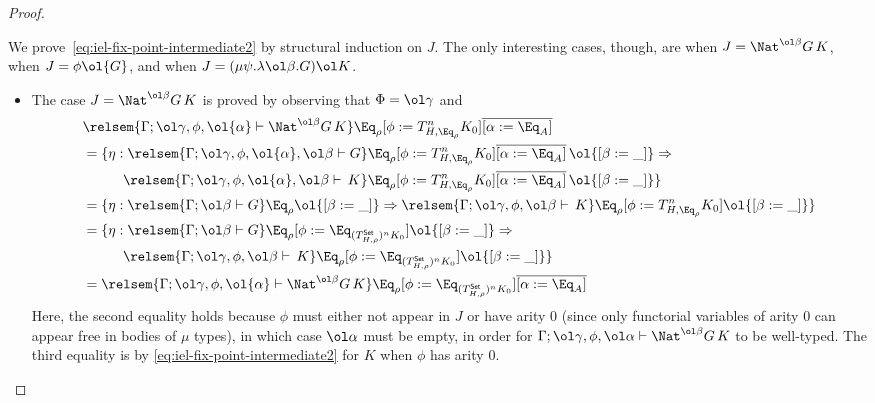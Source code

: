 \documentclass[acmsmall,review,anonymous]{acmart}
\theoremstyle{definition}
\newcommand{\set}{\mathsf{Set}}
\begin{document}
\begin{proof}
\begin{itemize}
We prove~\eqref{eq:iel-fix-point-intermediate2} by structural
induction on $J$. The only interesting cases, though, are when $J =
\Nat^{\ol\beta} G \,K$, when $J = \phi \ol{G}$, and when $J = (\mu
\psi.\lambda \ol\beta. G)\ol K$.
\begin{itemize}
\item 
  The case $J = \Nat^{\ol\beta} G \,K$ is proved by observing
  that $\Phi = \ol\gamma$ and 
\[
\begin{split}
& \relsem{\Gamma; \ol\gamma, \phi, \ol{\alpha} \vdash \Nat^{\ol\beta} G
    \,K} \Eq_{\rho} [\phi := T^{n}_{H,\Eq_{\rho}} K_0]
  \overline{[\alpha := \Eq_A]} \\
  &= \{ \eta : \relsem{\Gamma; \ol\gamma, \phi, \ol{\alpha},\ol\beta \vdash
    G}\Eq_{\rho} [\phi := T^{n}_{H,\Eq_{\rho}} K_0] \overline{[\alpha
      := \Eq_A]}\,\ol{[\beta := \_]} \Rightarrow  \\
  & \hspace*{0.4in} \relsem{\Gamma; \ol\gamma, \phi,
    \ol{\alpha},\ol\beta \vdash \,K}\Eq_{\rho} [\phi :=
    T^{n}_{H,\Eq_{\rho}} K_0] \overline{[\alpha := \Eq_A]}\,\ol{[\beta := \_]} \} \\
  &= \{ \eta : \relsem{\Gamma; \ol\beta \vdash
    G}\Eq_{\rho}\ol{[\beta := \_]} \Rightarrow \relsem{\Gamma; \ol\gamma, \phi,
    \ol\beta \vdash \,K}\Eq_{\rho} [\phi :=
    T^{n}_{H,\Eq_{\rho}} K_0]\ol{[\beta := \_]} \} \\
  &= \{ \eta : \relsem{\Gamma; \ol\beta \vdash
    G}\Eq_{\rho}[\phi
    := \Eq_{(T^\set_{H,\rho})^n K_0}]\ol{[\beta := \_]} \Rightarrow\\
& \hspace*{0.4in} \relsem{\Gamma; \ol\gamma, \phi,
    \ol\beta \vdash \,K}\Eq_{\rho}[\phi
  := \Eq_{(T^\set_{H,\rho})^n K_0}]\ol{[\beta := \_]} \} \\
&= \relsem{\Gamma; \ol\gamma, \phi, \ol{\alpha} \vdash \Nat^{\ol\beta} G
    \,K} \Eq_{\rho} [\phi := \Eq_{(T^\set_{H,\rho})^n K_0}]
  \overline{[\alpha := \Eq_A]} \\
\end{split}\]
Here, the second equality holds because $\phi$ must either not appear
in $J$ or have arity $0$ (since only functorial variables of arity $0$
can appear free in bodies of $\mu$ types), in which case $\ol\alpha$
must be empty, in order for $\Gamma;\ol\gamma, \phi,\ol\alpha \vdash
\Nat^{\ol\beta} G\,K$ to be well-typed. The third equality is by
\eqref{eq:iel-fix-point-intermediate2} for $K$ when $\phi$ has arity
$0$.


\end{itemize}
\end{itemize}
\end{proof}
\end{document}
